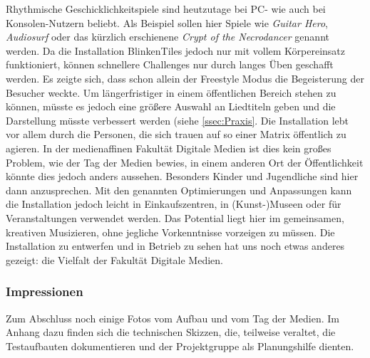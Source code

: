 
Rhythmische Geschicklichkeitspiele sind heutzutage bei PC- wie auch bei Konsolen-Nutzern beliebt. Als Beispiel sollen hier Spiele wie \textit{Guitar Hero}, \textit{Audiosurf} oder das kürzlich erschienene \textit{Crypt of the Necrodancer} genannt werden. Da die Installation BlinkenTiles jedoch nur mit vollem Körpereinsatz funktioniert, können schnellere Challenges nur durch langes Üben geschafft werden. Es zeigte sich, dass schon allein der Freestyle Modus die Begeisterung der Besucher weckte. Um längerfristiger in einem öffentlichen Bereich stehen zu können, müsste es jedoch eine größere Auswahl an Liedtiteln geben und die Darstellung müsste verbessert werden (siehe \autoref{ssec:Praxis}. Die Installation lebt vor allem durch die Personen, die sich trauen auf so einer Matrix öffentlich zu agieren. In der medienaffinen Fakultät Digitale Medien ist dies kein großes Problem, wie der Tag der Medien bewies, in einem anderen Ort der Öffentlichkeit könnte dies jedoch anders aussehen. Besonders Kinder und Jugendliche sind hier dann anzusprechen. Mit den genannten Optimierungen und Anpassungen kann die Installation jedoch leicht in Einkaufszentren, in (Kunst-)Museen oder für Veranstaltungen verwendet werden. Das Potential liegt hier im gemeinsamen, kreativen Musizieren, ohne jegliche Vorkenntnisse vorzeigen zu müssen. Die Installation zu entwerfen und in Betrieb zu sehen hat uns noch etwas anderes gezeigt: die Vielfalt der Fakultät Digitale Medien.

\subsubsection{Impressionen}
Zum Abschluss noch einige Fotos vom Aufbau und vom Tag der Medien. Im Anhang dazu finden sich die technischen Skizzen, die, teilweise veraltet, die Testaufbauten dokumentieren und der Projektgruppe als Planungshilfe dienten.